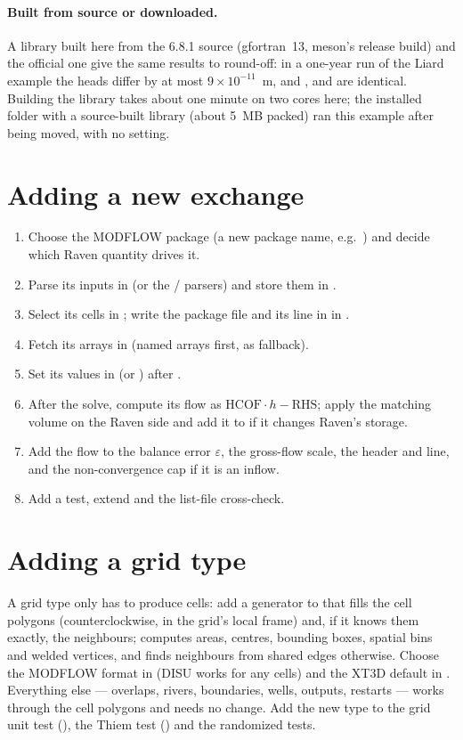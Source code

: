 \paragraph{Built from source or downloaded.} A library built here from the 6.8.1 source (gfortran~13, meson's release
build) and the official one give the same results to round-off: in a one-year run of the Liard example the heads differ by at most $9\times10^{-11}$~m, and ,  and  are identical. Building the library takes about one minute on two cores here; the installed folder with a source-built library (about 5~MB packed) ran this example after being moved, with no setting.

\section{Adding a new exchange}
\begin{enumerate}
\item Choose the MODFLOW package (a new package name, e.g.\ ) and decide which Raven quantity drives it.
\item Parse its inputs in  (or the / parsers) and store them in .
\item Select its cells in ; write the package file and its line in  in .
\item Fetch its arrays in  (named arrays first,  as fallback).
\item Set its values in  (or ) after .
\item After the solve, compute its flow as $\mathrm{HCOF}\cdot h-\mathrm{RHS}$; apply the matching volume on the Raven side
and add it to  if it changes Raven's storage.
\item Add the flow to the balance error $\varepsilon$, the gross-flow scale, the  header and line, and the
non-convergence cap if it is an inflow.
\item Add a test, extend  and the list-file cross-check.
\end{enumerate}
\section{Adding a grid type}
A grid type only has to produce cells: add a generator to  that fills the cell polygons (counterclockwise, in the
grid's local frame) and, if it knows them exactly, the neighbours;  computes areas, centres, bounding boxes,
spatial bins and welded vertices, and finds neighbours from shared edges otherwise. Choose the MODFLOW format in
 (DISU works for any cells) and the XT3D default in . Everything else --- overlaps, rivers,
boundaries, wells, outputs, restarts --- works through the cell polygons and needs no change. Add the new type to the grid unit
test (), the Thiem test () and the randomized tests.

